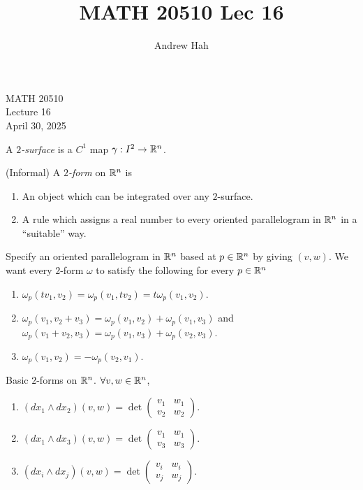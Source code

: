\documentclass[11pt]{article}
\title{MATH 20510 Lec 16}
\author{Andrew Hah}
\begin{document}
\pagestyle{plain}
\begin{center}
{\Large MATH 20510} \\
{\Large Lecture 16} \\
\vspace{.2in}
April 30, 2025
\end{center}

\begin{definition} A \emph{$2$-surface} is a $C^1$ map $\gamma : I^2 \to \mathbb{R}^n$.
\end{definition}

\begin{definition} (Informal) A \emph{$2$-form} on $\mathbb{R}^n$ is
  \begin{enumerate}
  \item An object which can be integrated over any $2$-surface.
  \item A rule which assigns a real number to every oriented parallelogram in $\mathbb{R}^n$ in a ``suitable'' way.
  \end{enumerate}
\end{definition}

Specify an oriented parallelogram in $\mathbb{R}^n$ based at $p \in \mathbb{R}^n$ by giving $(v, w)$. We want every $2$-form $\omega$ to satisfy the following for every $p \in \mathbb{R}^n$
\begin{enumerate}
\item $\omega_p(tv_1, v_2) = \omega_p(v_1, tv_2) = t \omega_p(v_1, v_2)$.
\item $\omega_p(v_1, v_2 + v_3) = \omega_p (v_1, v_2) + \omega_p(v_1, v_3)$ and $\omega_p(v_1 + v_2, v_3) = \omega_p(v_1, v_3) + \omega_p(v_2, v_3)$.
\item $\omega_p(v_1, v_2) = - \omega_p(v_2, v_1)$.
\end{enumerate}

Basic $2$-forms on $\mathbb{R}^n$. $\forall v, w \in \mathbb{R}^n$,
\begin{enumerate}
\item $(dx_1 \wedge dx_2)(v, w) = \det \begin{pmatrix} v_1 & w_1 \\ v_2 & w_2 \end{pmatrix}$.
\item $(dx_1 \wedge dx_3)(v, w) = \det \begin{pmatrix} v_1 & w_1 \\ v_3 & w_3 \end{pmatrix}$.
\item $(dx_i \wedge dx_j)(v, w) = \det \begin{pmatrix} v_i & w_i \\ v_j & w_j \end{pmatrix}$.
\end{enumerate}
\end{document}
